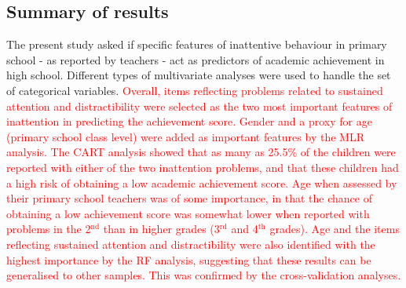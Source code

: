 \documentclass[10pt,letterpaper]{article}
\begin{document}
{{\subsection*{Summary of results}
The present study asked if specific features of inattentive behaviour in primary school - as reported by teachers - act as predictors of academic achievement in high school. Different types of multivariate analyses were used to handle the set of categorical variables.  \textcolor{red}{Overall, items reflecting problems related to sustained attention and distractibility were selected as the two most important features of inattention in predicting the achievement score. Gender and a proxy for age (primary school class level) were added as important features by the MLR analysis. The CART analysis showed that as many as 25.5\% of the children were reported with either of the two inattention problems, and that these children had a high risk of obtaining a low academic achievement score. Age  when assessed by their primary school teachers was of some importance, in that the chance of obtaining a low achievement score was somewhat lower when reported with problems in the  2$^{\text{nd}}$ than in higher grades (3$^{\text{rd}}$ and 4$^{\text{th}}$  grades). Age and the items reflecting sustained attention and distractibility were also identified with the highest importance by the RF analysis, suggesting that these results can be generalised to other samples. This was confirmed by the cross-validation analyses.}\\

% 

}}
\end{document}
